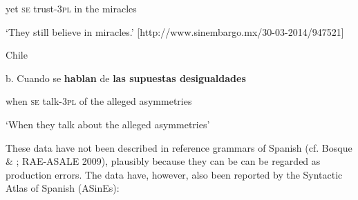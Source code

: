 \documentclass[output=paper]{langsci/langscibook}
\begin{document}
\begin{styleBodyTextIndentii}
        yet         \textsc{se}   trust{}-\textsc{3pl}  in  the   miracles
\end{styleBodyTextIndentii}

\begin{styleBodyTextIndentii}
‘They still believe in miracles.’ [http://www.sinembargo.mx/30-03-2014/947521]
\end{styleBodyTextIndentii}

\begin{styleBodyTextIndentii}
  Chile
\end{styleBodyTextIndentii}

\begin{styleBodyTextIndentii}
b.   Cuando se   \textbf{hablan}    de  \textbf{las supuestas desigualdades}  
\end{styleBodyTextIndentii}

\begin{styleBodyTextIndentii}
                 when     \textsc{se}   talk{}-\textsc{3pl}   of  the alleged      asymmetries
\end{styleBodyTextIndentii}

\begin{styleBodyTextIndentii}
       ‘When they talk about the alleged asymmetries’
\end{styleBodyTextIndentii}

\begin{styleBodyTextIndentii}
\end{styleBodyTextIndentii}

\begin{styleHTMLPreformatted}
These data have not been described in reference grammars of Spanish (cf. Bosque \& \citealt{Demonte1999}; RAE-ASALE 2009), plausibly because they can be can be regarded as production errors. The data have, however, also been reported by the Syntactic Atlas of Spanish (ASinEs):
\end{styleHTMLPreformatted}
\end{document}
